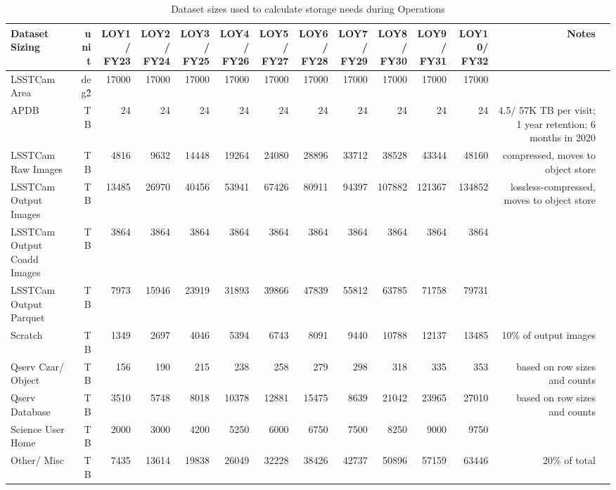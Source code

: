 \tiny \begin{longtable} { |p{}  |r  |r  |r  |r  |r  |r  |r  |r  |r  |r  |r  |r  |r |} 
\caption{Dataset sizes used to calculate storage needs during Operations \label{tab:datasetSizingOps}}\\ 
\hline 
\textbf{Dataset Sizing}&\textbf{unit}&\textbf{LOY1/ FY23}&\textbf{LOY2/ FY24}&\textbf{LOY3/ FY25}&\textbf{LOY4/ FY26}&\textbf{LOY5/ FY27}&\textbf{LOY6/ FY28}&\textbf{LOY7/ FY29}&\textbf{LOY8/ FY30}&\textbf{LOY9/ FY31}&\textbf{LOY10/ FY32}&\textbf{Notes} \\ \hline
{LSSTCam Area}&{deg\^2}&{17000}&{17000}&{17000}&{17000}&{17000}&{17000}&{17000}&{17000}&{17000}&{17000}& \\ \hline
{APDB}&{TB}&{24}&{24}&{24}&{24}&{24}&{24}&{24}&{24}&{24}&{24}&{4.5/ 57K TB per visit; 1 year retention; 6 months in 2020} \\ \hline
{LSSTCam Raw Images}&{TB}&{4816}&{9632}&{14448}&{19264}&{24080}&{28896}&{33712}&{38528}&{43344}&{48160}&{compressed, moves to object store} \\ \hline
{LSSTCam Output Images}&{TB}&{13485}&{26970}&{40456}&{53941}&{67426}&{80911}&{94397}&{107882}&{121367}&{134852}&{lossless-compressed, moves to object store} \\ \hline
{LSSTCam Output Coadd Images}&{TB}&{3864}&{3864}&{3864}&{3864}&{3864}&{3864}&{3864}&{3864}&{3864}&{3864}& \\ \hline
{LSSTCam Output Parquet}&{TB}&{7973}&{15946}&{23919}&{31893}&{39866}&{47839}&{55812}&{63785}&{71758}&{79731}& \\ \hline
{Scratch}&{TB}&{1349}&{2697}&{4046}&{5394}&{6743}&{8091}&{9440}&{10788}&{12137}&{13485}&{10\% of output images} \\ \hline
{Qserv Czar/ Object}&{TB}&{156}&{190}&{215}&{238}&{258}&{279}&{298}&{318}&{335}&{353}&{based on row sizes and counts} \\ \hline
{Qserv Database}&{TB}&{3510}&{5748}&{8018}&{10378}&{12881}&{15475}&{8639}&{21042}&{23965}&{27010}&{based on row sizes and counts} \\ \hline
{Science User Home}&{TB}&{2000}&{3000}&{4200}&{5250}&{6000}&{6750}&{7500}&{8250}&{9000}&{9750}& \\ \hline
{Other/ Misc}&{TB}&{7435}&{13614}&{19838}&{26049}&{32228}&{38426}&{42737}&{50896}&{57159}&{63446}&{20\% of total} \\ \hline
\end{longtable} \normalsize
